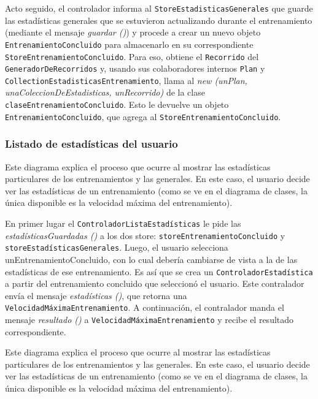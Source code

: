 Acto seguido, el controlador informa al \texttt{StoreEstadisticasGenerales} que guarde las estadísticas generales que se estuvieron actualizando durante el entrenamiento (mediante el mensaje \emph{guardar ()}) y procede a crear un nuevo objeto \texttt{EntrenamientoConcluido} para almacenarlo en su correspondiente \texttt{StoreEntrenamientoConcluido}. Para eso, obtiene el \texttt{Recorrido} del \texttt{GeneradorDeRecorridos} y, usando sus colaboradores internos \texttt{Plan} y \texttt{CollectionEstadisticasEntrenamiento}, llama al \emph{new (unPlan, unaColeccionDeEstadisticas, unRecorrido)} de la clase \texttt{claseEntrenamientoConcluido}. Esto le devuelve un objeto \texttt{EntrenamientoConcluido}, que agrega al \texttt{StoreEntrenamientoConcluido}.

\subsubsection{Listado de estadísticas del usuario}



Este diagrama explica el proceso que ocurre al mostrar las estadísticas particulares de los entrenamientos y las generales. En este caso, el usuario decide ver las estadísticas de un entrenamiento (como se ve en el diagrama de clases, la única disponible es la velocidad máxima del entrenamiento).


En primer lugar el \texttt{ControladorListaEstadísticas} le pide las \emph{estadísticasGuardadas ()} a los dos store: \texttt{storeEntrenamientoConcluido} y \texttt{storeEstadísticasGenerales}. Luego, el usuario selecciona {unEntrenamientoConcluido}, con lo cual debería cambiarse de vista a la de las estadísticas de ese entrenamiento. Es así que se crea un \texttt{ControladorEstadística} a partir del entrenamiento concluido que seleccionó el usuario. Este contralador envía el mensaje \emph{estadísticas ()}, que retorna una \texttt{VelocidadMáximaEntrenamiento}. A continuación, el contralador manda el mensaje \emph{resultado ()} a \texttt{VelocidadMáximaEntrenamiento} y recibe el resultado correspondiente. 


Este diagrama explica el proceso que ocurre al mostrar las estadísticas particulares de los entrenamientos y las generales. En este caso, el usuario decide ver las estadísticas de un entrenamiento (como se ve en el diagrama de clases, la única disponible es la velocidad máxima del entrenamiento).


